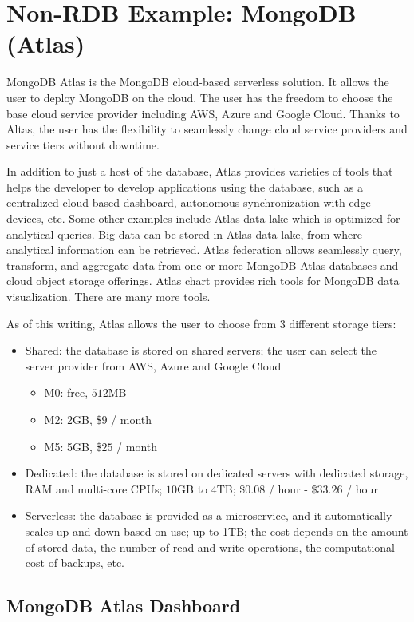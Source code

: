 \section{Non-RDB Example: MongoDB (Atlas)}

MongoDB Atlas is the MongoDB cloud-based serverless solution. It allows the user to deploy MongoDB on the cloud. The user has the freedom to choose the base cloud service provider including AWS, Azure and Google Cloud. Thanks to Altas, the user has the flexibility to seamlessly change cloud service providers and service tiers without downtime. 

In addition to just a host of the database, Atlas provides varieties of tools that helps the developer to develop applications using the database, such as a centralized cloud-based dashboard, autonomous synchronization with edge devices, etc. Some other examples include Atlas data lake which is optimized for analytical queries. Big data can be stored in Atlas data lake, from where analytical information can be retrieved. Atlas federation allows seamlessly query, transform, and aggregate data from one or more MongoDB Atlas databases and cloud object storage offerings. Atlas chart provides rich tools for MongoDB data visualization. There are many more tools.

As of this writing, Atlas allows the user to choose from 3 different storage tiers:
\begin{itemize}
  \item Shared: the database is stored on shared servers; the user can select the server provider from AWS, Azure and Google Cloud
  \begin{itemize}
    \item M0: free, $512$MB
    \item M2: 2GB, \$$9$ / month
    \item M5: 5GB, \$$25$ / month
  \end{itemize}
  \item Dedicated: the database is stored on dedicated servers with dedicated storage, RAM and multi-core CPUs; $10$GB to $4$TB; \$$0.08$ / hour - \$$33.26$ / hour
  \item Serverless: the database is provided as a microservice, and it automatically scales up and down based on use; up to 1TB; the cost depends on the amount of stored data, the number of read and write operations, the computational cost of backups, etc.
\end{itemize}

\subsection{MongoDB Atlas Dashboard}

